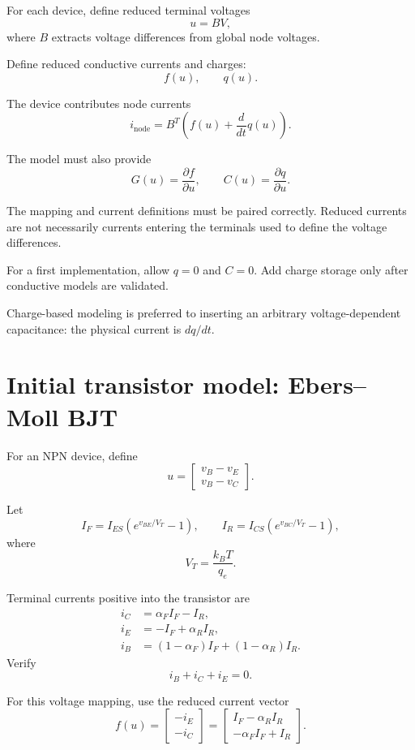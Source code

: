 \documentclass[11pt,a4paper]{article}
\begin{document}
For each device, define reduced terminal voltages
\[
 u=B V,
\]
where $B$ extracts voltage differences from global node voltages.

Define reduced conductive currents and charges:
\[
 f(u), \qquad q(u).
\]

The device contributes node currents
\[
 i_{\mathrm{node}}
 =B^T\left(f(u)+\frac{d}{dt}q(u)\right).
\]

The model must also provide
\[
 G(u)=\frac{\partial f}{\partial u},\qquad
 C(u)=\frac{\partial q}{\partial u}.
\]

The mapping and current definitions must be paired correctly.
Reduced currents are not necessarily currents entering the terminals
used to define the voltage differences.

For a first implementation, allow $q=0$ and $C=0$.
Add charge storage only after conductive models are validated.

Charge-based modeling is preferred to inserting an arbitrary
voltage-dependent capacitance: the physical current is $dq/dt$.

\section{Initial transistor model: Ebers--Moll BJT}

For an NPN device, define
\[
 u=
 \begin{bmatrix}
 v_B-v_E\\
 v_B-v_C
 \end{bmatrix}.
\]

Let
\[
 I_F=I_{ES}\left(e^{v_{BE}/V_T}-1\right),\qquad
 I_R=I_{CS}\left(e^{v_{BC}/V_T}-1\right),
\]
where
\[
 V_T=\frac{k_B T}{q_e}.
\]

Terminal currents positive into the transistor are
\[
\begin{aligned}
 i_C&=\alpha_F I_F-I_R,\\
 i_E&=-I_F+\alpha_R I_R,\\
 i_B&=(1-\alpha_F)I_F+(1-\alpha_R)I_R.
\end{aligned}
\]
Verify
\[
 i_B+i_C+i_E=0.
\]

For this voltage mapping, use the reduced current vector
\[
 f(u)=
 \begin{bmatrix}
 -i_E\\ -i_C
 \end{bmatrix}
 =
 \begin{bmatrix}
 I_F-\alpha_R I_R\\
 -\alpha_F I_F+I_R
 \end{bmatrix}.
\]
\end{document}

